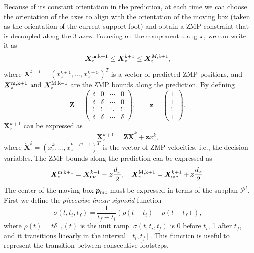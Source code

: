 Because of its constant orientation in the prediction, at each time we can choose the orientation of the axes to align with the orientation of the moving box (taken as the orientation of the current support foot) and obtain a ZMP constraint that is decoupled along the 3 axes. Focusing on the component along $x$, we can write it as
\begin{equation}\label{eq:FAPA:ZMP_constraints}
    \bm{X}_z^{\rm m,k+1} \le \bm{X}_z^{k+1} \le \bm{X}_z^{M,k+1},
\end{equation}
where $\bm{X}_z^{k+1} = (x_z^{k+1}, \dots, x_z^{k+C})^T$ is a vector of predicted ZMP positions, and $\bm{X}_z^{\rm m,k+1}$ and $\bm{X}_z^{\rm M,k+1}$ are the ZMP bounds along the prediction.
By defining
\begin{equation*}
    \bm{Z} =
    \begin{pmatrix}
        \delta & 0 & \cdots & 0 \\
        \delta & \delta & \cdots & 0 \\
        \vdots & \vdots & \ddots & \vdots \\
        \delta & \delta & \cdots & \delta
    \end{pmatrix},
    \qquad
    \bm{z} =
    \begin{pmatrix}
        1 \\ 1 \\ \vdots \\ 1
    \end{pmatrix},
\end{equation*}
$\bm{X}_z^{k+1}$ can be expressed as
\begin{equation}
    \label{eq:FAPA:zmp-model-matrix-form}
    \bm{X}_z^{k+1} = \bm{Z} \dot{\bm{X}}_z^{k} + \bm{z} x_z^k,
\end{equation}
where $\dot{\bm{X}}_z^{k} = (\dot x_z^{k}, \dots, \dot x_z^{k+C-1})^T$ is the vector of ZMP velocities, i.e., the decision variables. The ZMP bounds along the prediction can be expressed as
\begin{equation}
    \bm{X}_z^{\rm m,k+1} = \bm{X}_{\rm mc}^{k+1} - {\bm{z}} \frac{d_x}{2}, \quad 
    \bm{X}_z^{\rm M,k+1} = \bm{X}_{\rm mc}^{k+1} + {\bm{z}} \frac{d_x}{2}.
\label{eq:FAPA:zmp_constraint_displacement}
\end{equation}
The center of the moving box ${\bm{p}}_{\rm mc}$ must be expressed in terms of the subplan $\mathcal{P}^l$. First we define the {\em piecewise-linear sigmoid} function 
\begin{equation*}
\sigma (t,t_i,t_f)=\frac{1}{t_f-t_i} \left(\rho(t-t_i)-\rho(t-t_f)\right),
\end{equation*}
where $\rho(t)=t\delta_{-1}(t)$ is the unit ramp. $\sigma (t,t_i,t_f)$ is 0 before $t_i$,  1 after $t_f$, and it transitions linearly in the interval $[t_i,t_f]$. This function is useful to represent the transition between consecutive footsteps.


